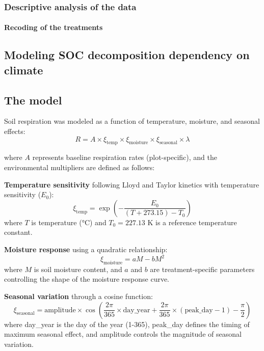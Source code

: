 \documentclass[12pt,a4paper]{article}
\begin{document}
\subsubsection{Descriptive analysis of the data}


\paragraph{Recoding of the treatments}


\subsection{Modeling SOC decomposition dependency on climate}


\subsection{The model}
Soil respiration was modeled as a function of temperature, moisture, and seasonal effects:
\begin{equation}
R = A \times \xi_{\text{temp}} \times \xi_{\text{moisture}} \times \xi_{\text{seasonal}} \times \lambda
\end{equation}

where $A$ represents baseline respiration rates (plot-specific), and the environmental multipliers are defined as follows:

\textbf{Temperature sensitivity} following Lloyd and Taylor kinetics with temperature sensitivity ($E_0$):
\begin{equation}
\xi_{\text{temp}} = \exp\left(-\frac{E_0}{(T + 273.15) - T_0}\right)
\end{equation}
where $T$ is temperature (°C) and $T_0 = 227.13$ K is a reference temperature constant.

\textbf{Moisture response} using a quadratic relationship:
\begin{equation}
\xi_{\text{moisture}} = aM - bM^2
\end{equation}
where $M$ is soil moisture content, and $a$ and $b$ are treatment-specific parameters controlling the shape of the moisture response curve.

\textbf{Seasonal variation} through a cosine function:
\begin{equation}
\xi_{\text{seasonal}} = \text{amplitude} \times \cos\left(\frac{2\pi}{365} \times \text{day\_year} + \frac{2\pi}{365} \times (\text{peak\_day} - 1) - \frac{\pi}{2}\right)
\end{equation}
where day\_year is the day of the year (1-365), peak\_day defines the timing of maximum seasonal effect, and amplitude controls the magnitude of seasonal variation.
\end{document}
